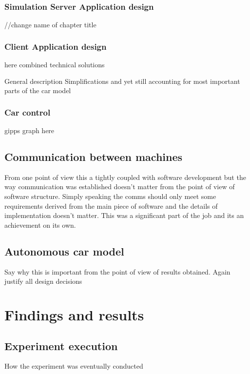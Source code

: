 \documentclass[11pt]{article}
\begin{document}
\subsubsection{Simulation Server Application design}
//change name of chapter title








\subsubsection{Client Application design}

here combined technical solutions 

General description Simplifications and yet still accounting for most important parts of
the car model

\subsubsection{Car control}

gipps graph here


\subsection{Communication between machines}

From one point of view this a tightly coupled with software development but the way
communication was established doesn’t matter from the point of view of software structure.
Simply speaking the comms should only meet some requirements derived from
the main piece of software and the details of implementation doesn’t matter. This was
a significant part of the job and its an achievement on its own.

\subsection{Autonomous car model}





Say why this is important from the point of view of results obtained. Again justify all
design decisions




\section{Findings and results}


\subsection{Experiment execution}
How the experiment was eventually conducted
\end{document}
